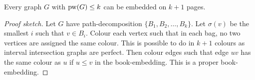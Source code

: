 \begin{theorem}
	Every graph \(G\) with \(\operatorname{pw}(G) \leq k\) can be embedded on $k + 1$ pages.
\end{theorem}

\begin{proof}[Proof sketch]
	Let $G$ have path-decomposition $\{B_1, B_2, \ldots , B_k\}$. Let $\sigma(v)$ be the smallest $i$ such that $v \in B_i$. Colour each vertex such that in each bag, no two vertices are assigned the same colour. This is possible to do in $k+1$ colours as interval intersection graphs are perfect. Then colour edges such that edge $uv$ has the same colour as $u$ if $u \leq v$ in the book-embedding. This is a proper book-embedding.
\end{proof}